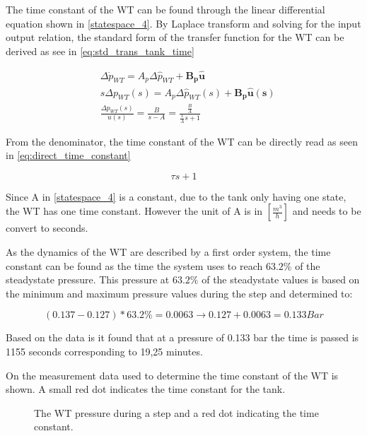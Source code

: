 The time constant of the WT can be found through the linear differential equation shown in \eqref{statespace_4}. By Laplace transform and solving for the input output relation, the standard form of the transfer function for the WT can be derived as see in \eqref{eq:std_trans_tank_time}

\begin{equation}
	\begin{split}
	&\Delta \dot{p}_{WT} = A_p \Delta \hat{p}_{WT}  + \pmb{B_p}\pmb{\hat{u}}\\
	&s\Delta p_{WT}(s) = A_p \Delta \hat{p}_{WT}(s)  + \pmb{B_p}\pmb{\hat{u}(s)}\\
	&\frac{\Delta p_{WT}(s)}{u(s)} = \frac{B}{s-A} = \frac{\frac{B}{A}}{\frac{1}{A}s + 1}
	\end{split}
	\label{eq:std_trans_tank_time}
\end{equation}

From the denominator, the time constant of the WT can be directly read as seen in \eqref{eq:direct_time_constant}

\begin{equation}
	\tau s + 1
	\label{eq:direct_time_constant}
\end{equation}

 Since A in \eqref{statespace_4} is a constant, due to the tank only having one state, the WT has one time constant. However the unit of A is in $[\frac{m^3}{h}]$ and needs to be convert to seconds. 

As the dynamics of the WT are described by a first order system, the time constant can be found as the time the system uses to reach $63.2\%$ of the steadystate pressure.
This pressure at $63.2\%$ of the steadystate values is based on the minimum and maximum pressure values during the step and determined to:

\begin{equation}
(0.137 - 0.127)*63.2 \% = 0.0063 \rightarrow 0.127 + 0.0063 = 0.133 Bar 
\end{equation}

Based on the data is it found that at a pressure of 0.133 bar the time is passed is 1155 seconds corresponding to 19,25 minutes. 

On  the measurement data used to determine the time constant of the WT is shown. A small red dot indicates the time constant for the tank.

\begin{figure}[H]

\caption{The WT pressure during a step and a red dot indicating the time constant.}
\label{fig:Test_WT_Timeconstant}
\end{figure}

